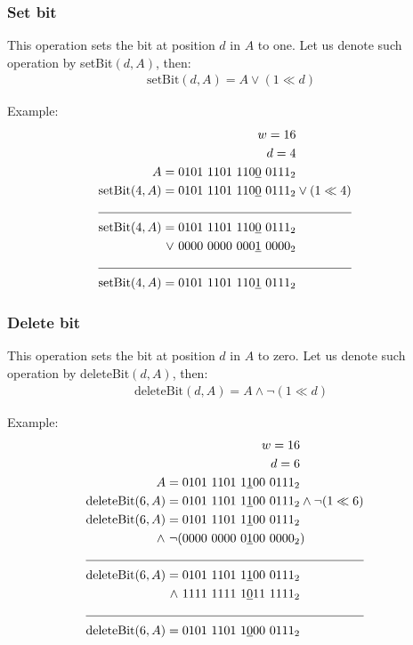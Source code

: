 \subsubsection{Set bit}
This operation sets the bit at position $d$ in $A$ to one. Let us denote such operation by setBit$(d, A)$, then:
\begin{align*}
    \text{setBit}(d, A) = A \vee (1 \ll d)
\end{align*}

Example:
\begin{align*}
    w = 16\\
    d = 4\\
    A = 0101\ 1101\ 110\underline{0}\ 0111_2& \\
    \text{setBit}(4,A) = 0101\ 1101\ 110\underline{0}\ 0111_2& \vee (1 \ll 4) \\
    \cline{1-2}
    \text{setBit}(4,A) = 0101\ 1101\ 110\underline{0}\ 0111_2& \\
    \vee\  0000\ 0000\ 000\underline{1}\ 0000_2& \\
    \cline{1-2}
    \text{setBit}(4,A) = 0101\ 1101\ 110\underline{1}\ 0111_2&
\end{align*}

\subsubsection{Delete bit}
This operation sets the bit at position $d$ in $A$ to zero. Let us denote such operation by deleteBit$(d, A)$, then:
\begin{align*}
    \text{deleteBit}(d, A) = A \wedge \neg(1 \ll d)
\end{align*}

Example:
\begin{align*}
    w = 16\\
    d = 6\\
    A = 0101\ 1101\ 1\underline{1}00\ 0111_2& \\
    \text{deleteBit}(6,A) = 0101\ 1101\ 1\underline{1}00\ 0111_2& \wedge \neg(1 \ll 6) \\
    \text{deleteBit}(6,A) = 0101\ 1101\ 1\underline{1}00\ 0111_2&\\
    \wedge\ \neg(0000\ 0000\ 0\underline{1}00\ 0000_2&) \\
    \cline{1-2}
    \text{deleteBit}(6,A) = 0101\ 1101\ 1\underline{1}00\ 0111_2& \\
    \wedge\ 1111\ 1111\ 1\underline{0}11\ 1111_2 \\
    \cline{1-2}
    \text{deleteBit}(6,A) = 0101\ 1101\ 1\underline{0}00\ 0111_2&
\end{align*}

